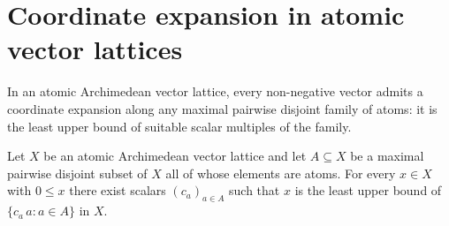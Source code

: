 \section{Coordinate expansion in atomic vector lattices}

In an atomic Archimedean vector lattice, every non-negative vector
admits a coordinate expansion along any maximal pairwise disjoint
family of atoms: it is the least upper bound of suitable scalar
multiples of the family.

\begin{theorem}
\label{thm:exists-isLUB-smul-of-isAtomic-maximal-disjoint}
\leanok
{}
Let $X$ be an atomic Archimedean vector lattice and let $A \subseteq
X$ be a maximal pairwise disjoint subset of $X$ all of whose
elements are atoms. For every $x \in X$ with $0 \le x$ there exist
scalars $(c_a)_{a \in A}$ such that $x$ is the least upper bound of
$\{c_a\,a : a \in A\}$ in $X$.
\end{theorem}
